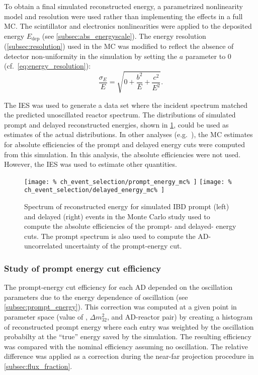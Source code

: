 To obtain a final simulated reconstructed energy,
a parametrized nonlinearity model and resolution were used
rather than implementing the effects in a full MC.
The scintillator and electronics nonlinearities were applied
to the deposited energy $E_{\text{dep}}$
(see \cref{subsec:abs_energyscale}).
The energy resolution (\cref{subsec:resolution}) used in the MC
was modified to reflect
the absence of detector non-uniformity in the simulation
by setting the $a$ parameter to 0 (cf.\ \cref{eq:energy_resolution}):
\begin{equation}
    \frac{\sigma_E}{E} = \sqrt{0 + \frac{b^2}{E} + \frac{c^2}{E^2}}.
\end{equation}

The IES was used to generate a data set
where the incident \nuebar{} spectrum
matched the predicted unoscillated reactor \nuebar{} spectrum.
The distributions of simulated prompt and delayed reconstructed energies,
shown in \cref{fig:prompt_eff_mc},
could be used as estimates of the actual distributions.
In other analyses (e.g.\ \cite{nh2016}), the MC estimates
for absolute efficiencies of the prompt and delayed energy cuts
were computed from this simulation.
In this analysis, the absolute efficiencies were not used.
However, the IES was used to estimate other quantities.

\begin{figure}
    \centering
    \texttt{[image: \%
        ch\_event\_selection/prompt\_energy\_mc\%
    ]}
    \texttt{[image: \%
        ch\_event\_selection/delayed\_energy\_mc\%
    ]}
    \caption[Simulated prompt and delayed spectra]{Spectrum of reconstructed energy for simulated IBD prompt (left)
        and delayed (right) events
        in the Monte Carlo study used to compute the absolute efficiencies
        of the prompt- and delayed- energy cuts.
        The prompt spectrum is also used to compute the
        AD-uncorrelated uncertainty of the prompt-energy cut.
    }
    \label{fig:prompt_eff_mc}
\end{figure}

\subsubsection{Study of prompt energy cut efficiency}

The prompt-energy cut efficiency for each AD depended on
the oscillation parameters due to the energy dependence of \nuebar{} oscillation
(see \cref{subsec:prompt_energy}).
This correction was computed at a given point in parameter space
(value of \thetaot{}, $\Delta m^2_{32}$, and AD-reactor pair)
by creating a histogram of reconstructed prompt energy
where each entry was weighted by the oscillation probabilty
at the ``true'' \nuebar{} energy saved by the simulation.
The resulting efficiency was compared
with the nominal efficiency assuming no oscillation.
The relative difference was applied as a correction
during the near-far projection procedure in \cref{subsec:flux_fraction}.

